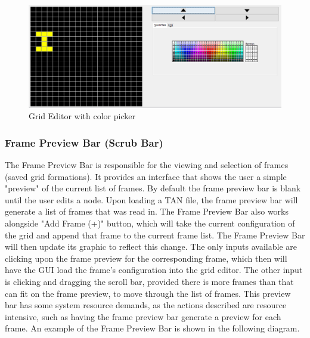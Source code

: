 \documentclass[12pt]{article}
\begin{document}
  
  
%  	
  
    \begin{figure}[H]
      \centering
      \includegraphics[width=150mm]{protoGrid.PNG}
      \caption{Grid Editor with color picker}
    \end{figure}
	\clearpage	
	
	\subsubsection {Frame Preview Bar (Scrub Bar)}
	The Frame Preview Bar is responsible for the viewing and selection of frames (saved grid formations). It provides an interface that shows the user a simple "preview" of the current list of frames. By default the frame preview bar is blank until the user edits a node. Upon loading a TAN file, the frame preview bar will generate a list of frames that was read in. The Frame Preview Bar also works alongside "Add Frame (+)" button, which will take the current configuration of the grid and append that frame to the current frame list. The Frame Preview Bar will then update its graphic to reflect this change. The only inputs available are clicking upon the frame preview for the corresponding frame, which then will have the GUI load the frame's configuration into the grid editor. The other input is clicking and dragging the scroll bar, provided there is more frames than that can fit on the frame preview, to move through the list of frames. This preview bar has some system resource demands, as the actions described are resource intensive, such as having the frame preview bar generate a preview for each frame. An example of the Frame Preview Bar is shown in the following diagram.
	
\end{document}
